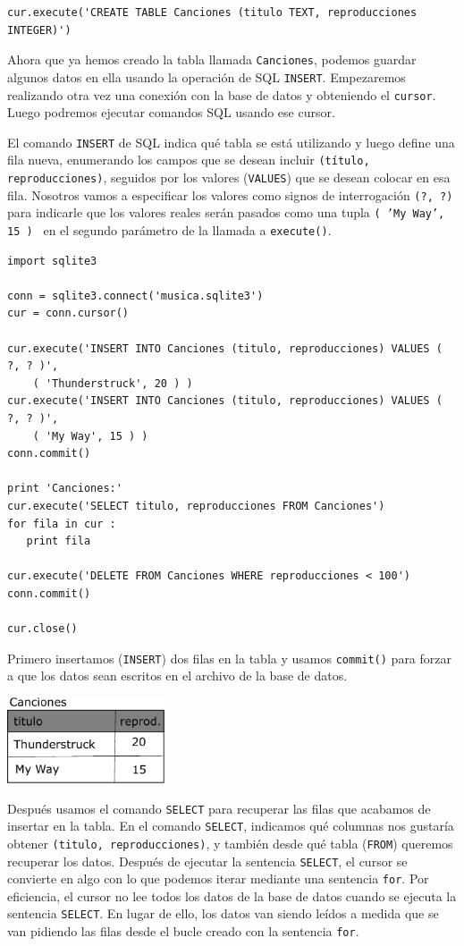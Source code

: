 \beforeverb
\begin{verbatim}
cur.execute('CREATE TABLE Canciones (titulo TEXT, reproducciones INTEGER)')
\end{verbatim}
\afterverb
%
Ahora que ya hemos creado la tabla llamada {\tt Canciones}, podemos guardar
algunos datos en ella usando la operación de SQL {\tt INSERT}. Empezaremos
realizando otra vez una conexión con la base de datos y obteniendo el {\tt cursor}.
Luego podremos ejecutar comandos SQL usando ese cursor.

El comando {\tt INSERT} de SQL indica qué tabla se está utilizando
y luego define una fila nueva, enumerando los campos que se desean
incluir {\tt (título, reproducciones)}, seguidos por los valores ({\tt VALUES}) que
se desean colocar en esa fila. Nosotros vamos a especificar los valores como signos de interrogación
{\tt (?, ?)} para indicarle que los valores reales serán pasados como una
tupla {\tt ( 'My Way', 15 ) } en el segundo parámetro de la
llamada a {\tt execute()}.

\beforeverb
\begin{verbatim}
import sqlite3

conn = sqlite3.connect('musica.sqlite3')
cur = conn.cursor()

cur.execute('INSERT INTO Canciones (titulo, reproducciones) VALUES ( ?, ? )', 
    ( 'Thunderstruck', 20 ) )
cur.execute('INSERT INTO Canciones (titulo, reproducciones) VALUES ( ?, ? )', 
    ( 'My Way', 15 ) )
conn.commit()

print 'Canciones:'
cur.execute('SELECT titulo, reproducciones FROM Canciones')
for fila in cur :
   print fila

cur.execute('DELETE FROM Canciones WHERE reproducciones < 100')
conn.commit()

cur.close()
\end{verbatim}
\afterverb
%
Primero insertamos ({\tt INSERT}) dos filas en la tabla y usamos {\tt commit()}
para forzar a que los datos sean escritos en el archivo de la base de datos.

\beforefig
\centerline{\includegraphics[height=1.00in]{figs2/tracks.eps}}
\afterfig

Después usamos el comando {\tt SELECT} para
recuperar las filas que acabamos de insertar en la tabla.
En el comando
{\tt SELECT}, indicamos qué columnas nos gustaría obtener {\tt (titulo, reproducciones)},
y también desde qué tabla ({\tt FROM}) queremos recuperar los datos. Después de
ejecutar la sentencia {\tt SELECT}, el cursor se convierte en algo con lo que podemos
iterar mediante una sentencia {\tt for}. Por eficiencia,
el cursor no lee todos los datos de la base de datos
cuando se ejecuta la sentencia {\tt SELECT}.
En lugar de ello, los datos van siendo leídos a medida que
se van pidiendo las filas desde el bucle creado con la sentencia {\tt for}.

